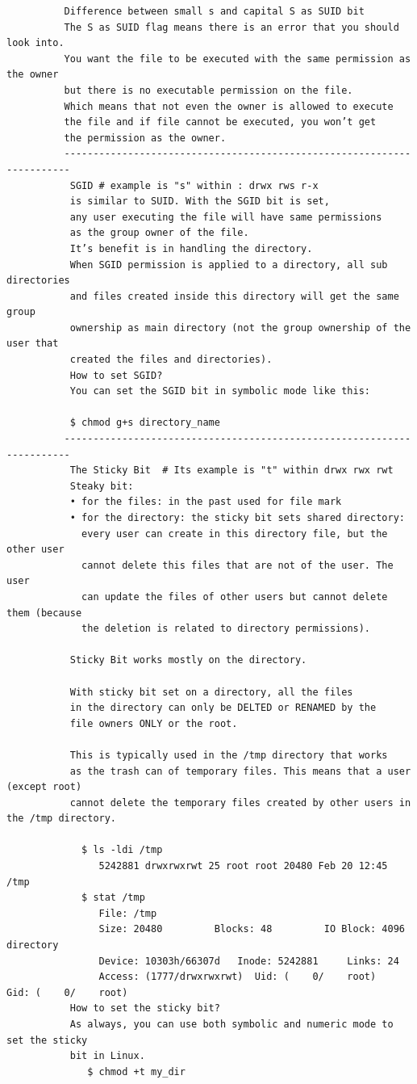\documentclass[a4paper,12pt]{article}
\begin{document}
\begin{verbatim}
          Difference between small s and capital S as SUID bit
          The S as SUID flag means there is an error that you should look into.
          You want the file to be executed with the same permission as the owner
          but there is no executable permission on the file.
          Which means that not even the owner is allowed to execute 
          the file and if file cannot be executed, you won’t get
          the permission as the owner.  
          -----------------------------------------------------------------------
           SGID # example is "s" within : drwx rws r-x
           is similar to SUID. With the SGID bit is set, 
           any user executing the file will have same permissions 
           as the group owner of the file.
           It’s benefit is in handling the directory. 
           When SGID permission is applied to a directory, all sub directories
           and files created inside this directory will get the same group 
           ownership as main directory (not the group ownership of the user that
           created the files and directories).
           How to set SGID?
           You can set the SGID bit in symbolic mode like this:

           $ chmod g+s directory_name
          -----------------------------------------------------------------------
           The Sticky Bit  # Its example is "t" within drwx rwx rwt  
           Steaky bit: 
           • for the files: in the past used for file mark 
           • for the directory: the sticky bit sets shared directory:
             every user can create in this directory file, but the other user 
             cannot delete this files that are not of the user. The user 
             can update the files of other users but cannot delete them (because 
             the deletion is related to directory permissions).             
           
           Sticky Bit works mostly on the directory. 
          
           With sticky bit set on a directory, all the files
           in the directory can only be DELTED or RENAMED by the
           file owners ONLY or the root.
           
           This is typically used in the /tmp directory that works 
           as the trash can of temporary files. This means that a user (except root)
           cannot delete the temporary files created by other users in the /tmp directory.
           
             $ ls -ldi /tmp
                5242881 drwxrwxrwt 25 root root 20480 Feb 20 12:45 /tmp
             $ stat /tmp
                File: /tmp
                Size: 20480     	Blocks: 48         IO Block: 4096   directory
                Device: 10303h/66307d	Inode: 5242881     Links: 24
                Access: (1777/drwxrwxrwt)  Uid: (    0/    root)   Gid: (    0/    root)
           How to set the sticky bit?
           As always, you can use both symbolic and numeric mode to set the sticky 
           bit in Linux.
              $ chmod +t my_dir
 
\end{verbatim}
\end{document}
